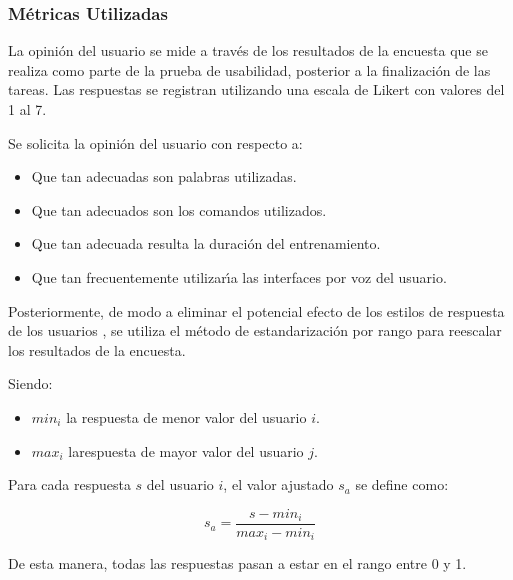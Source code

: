 \subsubsection{M\'etricas Utilizadas}
La opini\'on del usuario se mide a trav\'es de los resultados de la encuesta que se realiza como parte de
la prueba de usabilidad, posterior a la finalizaci\'on de las tareas. Las respuestas se
registran utilizando una escala de Likert \cite{Allen:2007} con valores del 1 al 7.

Se solicita la opini\'on del usuario con respecto a:
\begin{itemize}
	\item Que tan adecuadas son palabras utilizadas.
	\item Que tan adecuados son los comandos utilizados.
	\item Que tan adecuada resulta la duraci\'on del entrenamiento.
	\item Que tan frecuentemente utilizar{\'\i}a las interfaces por voz del usuario.
\end{itemize}

Posteriormente, de modo a eliminar el potencial efecto de los estilos de respuesta
de los usuarios \cite{Fischer2010}, se utiliza el m\'etodo de estandarizaci\'on 
por rango \cite{Pagolu2011} para reescalar los resultados de la encuesta.

Siendo:
\begin{itemize}
	\item $min_i$ la respuesta de menor valor del usuario $i$.
	\item $max_i$ larespuesta de mayor valor del usuario $j$.
\end{itemize}

Para cada respuesta $s$ del usuario $i$, el valor ajustado $s_a$ se define como:

\begin{equation*}
s_a=\frac{s-min_i}{max_i-min_i}
\end{equation*}


De esta manera, todas las respuestas pasan a estar en el rango entre 0 y 1.  




